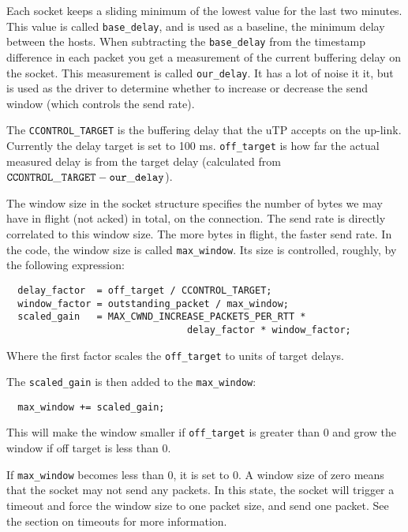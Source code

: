 \documentclass[11pt,a4paper,oneside,draft]{article}
\begin{document}
Each socket keeps a sliding minimum of the lowest value for the last two minutes. This value is called {\tt base\_delay}, and is used as a baseline, the minimum delay between the hosts. When subtracting the {\tt base\_delay} from the timestamp difference in each packet you get a measurement of the current buffering delay on the socket. This measurement is called {\tt our\_delay}. It has a lot of noise it it, but is used as the driver to determine whether to increase or decrease the send window (which controls the send rate).

The {\tt CCONTROL\_TARGET} is the buffering delay that the uTP accepts on the up-link. Currently the delay target is set to 100 ms. {\tt off\_target} is how far the actual measured delay is from the target delay (calculated from ${\tt CCONTROL\_TARGET} - {\tt our\_delay}$).

The window size in the socket structure specifies the number of bytes we may have in flight (not acked) in total, on the connection. The send rate is directly correlated to this window size. The more bytes in flight, the faster send rate. In the code, the window size is called {\tt max\_window}. Its size is controlled, roughly, by the following expression:

{\begin{verbatim}
  delay_factor  = off_target / CCONTROL_TARGET;
  window_factor = outstanding_packet / max_window;
  scaled_gain   = MAX_CWND_INCREASE_PACKETS_PER_RTT *
                                delay_factor * window_factor;
\end{verbatim}}
Where the first factor scales the {\tt off\_target} to units of target delays.

The {\tt scaled\_gain} is then added to the {\tt max\_window}:
{\begin{verbatim}
  max_window += scaled_gain;
\end{verbatim}}

This will make the window smaller if {\tt off\_target} is greater than 0 and grow the window if off target is less than 0.

If {\tt max\_window} becomes less than 0, it is set to 0. A window size of zero means that the socket may not send any packets. In this state, the socket will trigger a timeout and force the window size to one packet size, and send one packet. See the section on timeouts for more information.
\end{document}
